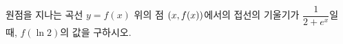 원점을 지나는 곡선 $y=f(x)$ 위의 점 $(x{,}\mkern3mu\mathopen{}f(x))$에서의 접선의 기울기가 $\dfrac{1}{2+e^x}$일 때, $f(\ln 2)$의 값을 구하시오.
